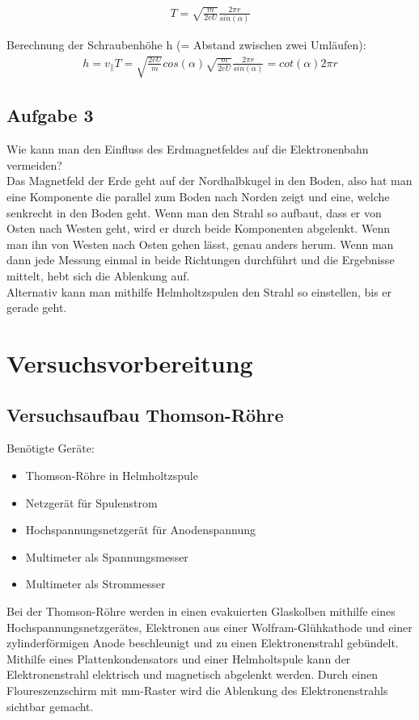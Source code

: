 \documentclass[a4paper,10pt]{scrartcl}
\begin{document}
	
	
	\begin{align}
	T=\sqrt{\frac{m}{2eU}}\frac{2\pi r}{sin(\alpha)}
	\end{align}
	
	\newpage
	
	Berechnung der Schraubenhöhe h (= Abstand zwischen zwei Umläufen):
	\begin{align}
	h=v_{\parallel}T=\sqrt{\frac{2eU}{m}}cos(\alpha)\sqrt{\frac{m}{2eU}}\frac{2\pi r}{sin(\alpha)}=cot(\alpha)2\pi r
	\end{align}
	
	\subsection{Aufgabe 3}
	
	Wie kann man den Einfluss des Erdmagnetfeldes auf die Elektronenbahn vermeiden?\\
	Das Magnetfeld der Erde geht auf der Nordhalbkugel in den Boden, also hat man eine Komponente die parallel zum Boden nach Norden zeigt und eine, welche senkrecht in den Boden geht. Wenn man den Strahl so aufbaut, dass er von Osten nach Westen geht, wird er durch beide Komponenten abgelenkt. Wenn man ihn von Westen nach Osten gehen lässt, genau anders herum. Wenn man dann jede Messung einmal in beide Richtungen durchführt und die Ergebnisse mittelt, hebt sich die Ablenkung auf.\\
	Alternativ kann man mithilfe Helmholtzspulen den Strahl so einstellen, bis er gerade geht.
	
	\section{Versuchsvorbereitung}
	\subsection{Versuchsaufbau Thomson-Röhre}
	Benötigte Geräte:
	\begin{itemize}
\item Thomson-Röhre in Helmholtzspule
\item Netzgerät für Spulenstrom
\item Hochspannungsnetzgerät für Anodenspannung
\item Multimeter als Spannungsmesser
\item Multimeter als Strommesser
\end{itemize}
Bei der Thomson-Röhre werden in einen evakuierten Glaskolben mithilfe eines Hochspannungsnetzgerätes, Elektronen aus einer Wolfram-Glühkathode und einer zylinderförmigen Anode beschleunigt und zu einen Elektronenstrahl gebündelt. Mithilfe eines Plattenkondensators und einer Helmholtspule kann der Elektronenstrahl elektrisch und magnetisch abgelenkt werden. Durch einen Floureszenzschirm mit mm-Raster wird die Ablenkung des Elektronenstrahls sichtbar gemacht.
\end{document}
